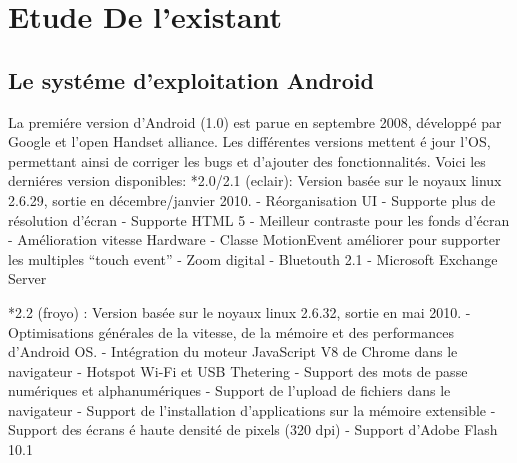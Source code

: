 \chapter{Etude De l'existant}
\section{Le systéme d'exploitation Android}La premiére version d'Android (1.0)
est parue en septembre 2008, développé par Google et l'open Handset alliance.
Les différentes versions mettent é jour l'OS, permettant ainsi de corriger les
bugs et d'ajouter des fonctionnalités.
Voici les derniéres version disponibles:
*2.0/2.1 (eclair):
Version basée sur le noyaux linux 2.6.29, sortie en décembre/janvier 2010.
- Réorganisation UI
- Supporte plus de résolution d'écran
- Supporte HTML 5
- Meilleur contraste pour les fonds d'écran
- Amélioration vitesse Hardware
- Classe MotionEvent améliorer pour supporter les multiples ``touch event''
- Zoom digital 
- Bluetouth 2.1
- Microsoft Exchange Server

*2.2 (froyo) :
Version basée sur le noyaux linux 2.6.32, sortie en mai 2010.
- Optimisations générales de la vitesse, de la mémoire et des performances
d'Android OS.
- Intégration du moteur JavaScript V8 de Chrome dans le navigateur
- Hotspot Wi-Fi et USB Thetering
- Support des mots de passe numériques et alphanumériques
- Support de l'upload de fichiers dans le navigateur
- Support de l'installation d'applications sur la mémoire extensible
- Support des écrans é haute densité de pixels (320 dpi)
- Support d'Adobe Flash 10.1

